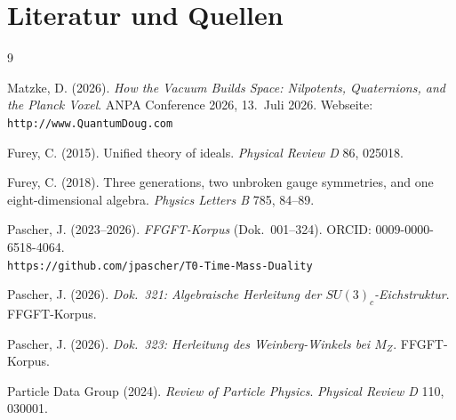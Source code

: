 \section*{Literatur und Quellen}

\begin{thebibliography}{9}

Matzke, D. (2026).
\textit{How the Vacuum Builds Space: Nilpotents, Quaternions,
and the Planck Voxel}.
ANPA Conference 2026, 13.~Juli 2026.
Webseite: \texttt{http://www.QuantumDoug.com}

Furey, C. (2015).
Unified theory of ideals.
\textit{Physical Review D} 86, 025018.

Furey, C. (2018).
Three generations, two unbroken gauge symmetries, and
one eight-dimensional algebra.
\textit{Physics Letters B} 785, 84--89.

Pascher, J. (2023--2026).
\textit{FFGFT-Korpus} (Dok.~001--324).
ORCID: 0009-0000-6518-4064.\\
\texttt{https://github.com/jpascher/T0-Time-Mass-Duality}

Pascher, J. (2026). \textit{Dok.~321: Algebraische Herleitung
der $SU(3)_c$-Eichstruktur}. FFGFT-Korpus.

Pascher, J. (2026). \textit{Dok.~323: Herleitung des Weinberg-Winkels
bei $M_Z$}. FFGFT-Korpus.

Particle Data Group (2024). \textit{Review of Particle Physics}.
\textit{Physical Review D} 110, 030001.

\end{thebibliography}

